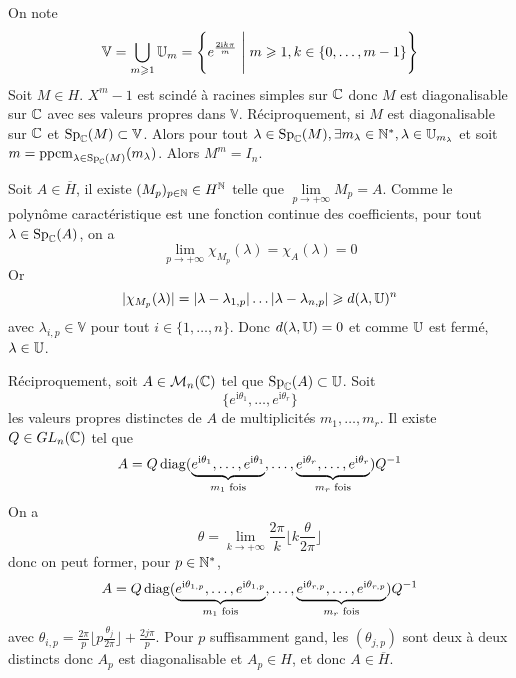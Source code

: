 \begin{solution}
	On note 
	$$\mathbb{V}=\bigcup_{m\geqslant1}\mathbb{U}_{m}=\Biggl\{e^{\frac{2\mathrm{i}k\pi}{m}}\Biggm| m\geqslant1,k\in\{0,\dots,m-1\}\Biggr\}$$
	Soit $M\in H$. $X^{m}-1$ est scindé à racines simples sur $\mathbb{C}$ donc $M$ est diagonalisable sur $\mathbb{C}$ avec ses valeurs propres dans $\mathbb{V}$. Réciproquement, si $M$ est diagonalisable sur $\mathbb{C}$ et $\operatorname{Sp}_{\mathbb{C}}(M)\subset\mathbb{V}$. Alors pour tout $\lambda\in\operatorname{Sp}_{\mathbb{C}}(M),\exists m_{\lambda}\in\mathbb{N}^{*},\lambda\in\mathbb{U}_{m_{\lambda}}$ et soit $m=\operatorname{ppcm}\limits_{\lambda\in\operatorname{Sp}_{\mathbb{C}}(M)}(m_{\lambda})$. Alors $M^{m}=I_{n}$.

	Soit $A\in\overline{H}$, il existe $(M_{p})_{p\in\mathbb{N}}\in H^{\mathbb{N}}$ telle que $\lim\limits_{p\to+\infty}M_{p}=A$. Comme le polynôme caractéristique est une fonction continue des coefficients, pour tout $\lambda\in\operatorname{Sp}_{\mathbb{C}}(A)$, on a 
	$$\lim\limits_{p\to+\infty}\chi_{M_{p}}(\lambda)=\chi_{A}(\lambda)=0$$
	Or 
	$$\vert\chi_{M_{p}}(\lambda)\vert=\vert\lambda-\lambda_{1,p}\vert\dots\vert\lambda-\lambda_{n,p}\vert\geqslant d(\lambda,\mathbb{U})^{n}$$
	avec $\lambda_{i,p}\in\mathbb{V}$ pour tout $i\in\{1,\dots,n\}$. Donc $d(\lambda,\mathbb{U})=0$ et comme $\mathbb{U}$ est fermé, $\lambda\in\mathbb{U}$.

	Réciproquement, soit $A\in\mathcal{M}_{n}(\mathbb{C})$ tel que $\operatorname{Sp}_{\mathbb{C}}(A)\subset\mathbb{U}$. Soit 
	$$\bigl\{e^{\mathrm{i}\theta_1},\dots,e^{\mathrm{i}\theta_r}\bigr\}$$
	les valeurs propres distinctes de $A$ de multiplicités $m_{1},\dots,m_{r}$. Il existe $Q\in GL_{n}(\mathbb{C})$ tel que 
	$$A=Q\operatorname{diag}(\underbrace{e^{\mathrm{i}\theta_{1}},\dots,e^{\mathrm{i}\theta_1}}_{m_{1}\text{ fois}},\dots,\underbrace{e^{\mathrm{i}\theta_r},\dots,e^{\mathrm{i}\theta_r}}_{m_{r}\text{ fois}})Q^{-1}$$
	On a 
	$$\theta=\lim\limits_{k\to+\infty}\frac{2\pi}{k}\lfloor k\frac{\theta}{2\pi}\rfloor$$
	donc on peut former, pour $p\in\mathbb{N}^{*}$,
	$$A=Q\operatorname{diag}(\underbrace{e^{\mathrm{i}\theta_{1,p}},\dots,e^{\mathrm{i}\theta_{1,p}}}_{m_{1}\text{ fois}},\dots,\underbrace{e^{\mathrm{i}\theta_{r,p}},\dots,e^{\mathrm{i}\theta_{r,p}}}_{m_{r}\text{ fois}})Q^{-1}$$
	avec $\theta_{i,p}=\frac{2\pi}{p}\lfloor p\frac{\theta_{j}}{2\pi}\rfloor+\frac{2 j\pi}{p}$. Pour $p$ suffisamment gand, les $(\theta_{j,p})$ sont deux à deux distincts donc $A_{p}$ est diagonalisable et $A_{p}\in H$, et donc $A\in \overline{H}$.
\end{solution}

